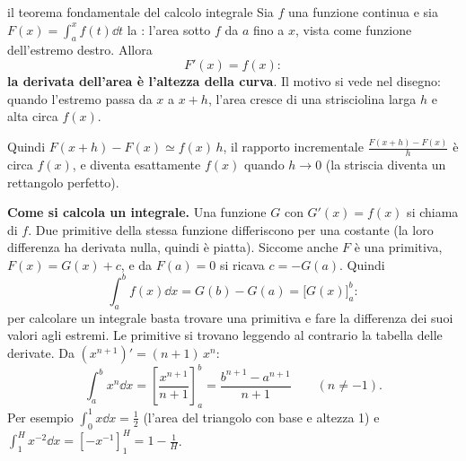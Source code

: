 \begin{richiamo}{il teorema fondamentale del calcolo integrale}
Sia $f$ una funzione continua e sia $F(x) = \int_a^x f(t) \dd t$ la : l'area sotto $f$ da
$a$ fino a $x$, vista come funzione dell'estremo destro. Allora
\[ F'(x) = f(x) : \]
\textbf{la derivata dell'area è l'altezza della curva}. Il motivo si vede nel disegno: quando l'estremo passa da $x$ a
$x + h$, l'area cresce di una strisciolina larga $h$ e alta circa $f(x)$.
\begin{center}
\end{center}
Quindi $F(x + h) - F(x) \simeq f(x)\, h$, il rapporto incrementale $\frac{F(x+h) - F(x)}{h}$ è circa $f(x)$, e diventa
esattamente $f(x)$ quando $h \to 0$ (la striscia diventa un rettangolo perfetto).

\textbf{Come si calcola un integrale.} Una funzione $G$ con $G'(x) = f(x)$ si chiama  di $f$. Due
primitive della stessa funzione differiscono per una costante (la loro differenza ha derivata nulla, quindi è
piatta). Siccome anche $F$ è una primitiva, $F(x) = G(x) + c$, e da $F(a) = 0$ si ricava $c = -G(a)$. Quindi
\[ \int_a^b f(x) \dd x = G(b) - G(a) = \Big[ G(x) \Big]_a^b : \]
per calcolare un integrale basta trovare una primitiva e fare la differenza dei suoi valori agli estremi. Le primitive
si trovano leggendo al contrario la tabella delle derivate. Da $(x^{n+1})' = (n+1)\,x^n$:
\[ \int_a^b x^n \dd x = \left[ \frac{x^{n+1}}{n+1} \right]_a^b = \frac{b^{n+1} - a^{n+1}}{n+1} \qquad (n \neq -1) . \]
Per esempio $\int_0^1 x \dd x = \frac12$ (l'area del triangolo con base e altezza 1) e
$\int_1^H x^{-2} \dd x = \left[ -x^{-1} \right]_1^H = 1 - \frac1H$.
\end{richiamo}

